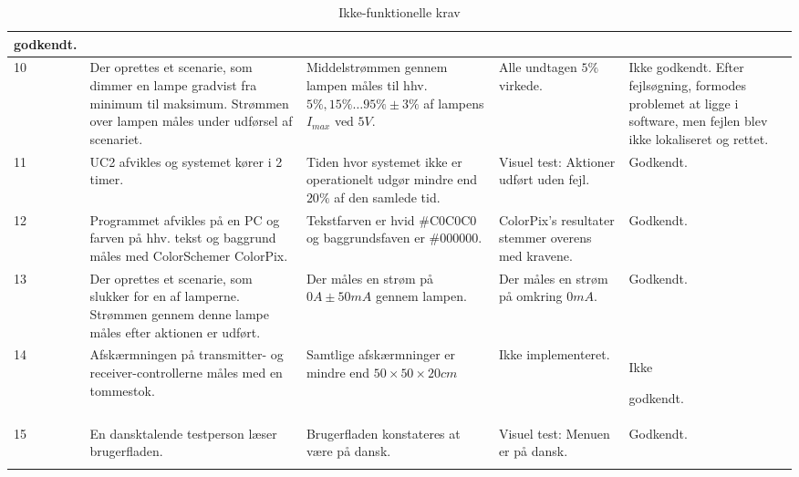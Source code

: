 \begin{longtable}{|l|>{\raggedright}X|>{\raggedright}X|>{\raggedright}X| >{\raggedright\arraybackslash}p{2.3 cm}|}
    godkendt.    \\ \hline
    10   & Der oprettes et scenarie, som dimmer en lampe gradvist fra minimum til maksimum. Strømmen over lampen måles under udførsel af scenariet. & Middelstrømmen gennem lampen måles til hhv. $5\%, 15\% \ldots 95\% \pm 3\%$ af lampens $I_{max}$ ved $5V$\cite{lib:LED}. & Alle undtagen $5\%$ virkede. & Ikke godkendt. Efter fejlsøgning, formodes problemet at ligge i software, men fejlen blev ikke lokaliseret og rettet.  \\ \hline
    11   & UC2 afvikles og systemet kører i 2 timer. & Tiden hvor systemet ikke er operationelt udgør mindre end $20\%$ af den samlede tid. &  Visuel test: Aktioner udført uden fejl. & Godkendt. \\ \hline
    12   & Programmet afvikles på en PC og farven på hhv. tekst og baggrund måles med ColorSchemer ColorPix\cite{lib:ColorPix}. & Tekstfarven er hvid \#C0C0C0 og baggrundsfaven er \#000000. & ColorPix's resultater stemmer overens med kravene.  & Godkendt.  \\ \hline
    13   & Der oprettes et scenarie, som slukker for en af lamperne. Strømmen gennem denne lampe måles efter aktionen er udført. & Der måles en strøm på $0A \pm 50 mA$ gennem lampen. & Der måles en strøm på omkring $0mA$. & Godkendt.    \\ \hline
    14   & Afskærmningen på transmitter- og receiver-controllerne måles med en tommestok. & Samtlige afskærmninger er mindre end $50 \times 50 \times 20 cm$ & Ikke implementeret.   & Ikke 
    
    godkendt.  \\ \hline
    15   & En dansktalende testperson læser brugerfladen. & Brugerfladen konstateres at være på dansk. & Visuel test: Menuen er på dansk.  & Godkendt. \\ \hline
\caption{Ikke-funktionelle krav}\label{tbl:acceptikkefunk}
\end{longtable}